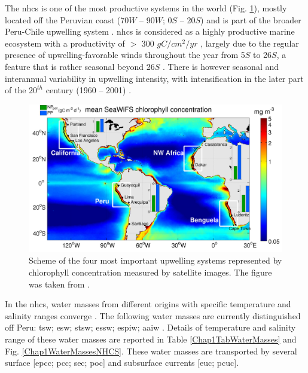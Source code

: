 The \acrshort{nhcs} is one of the most productive systems in the world (Fig. \ref{Chap1UpwellingSystems}), mostly located off the Peruvian coast (70\textdegree $W$ – 90\textdegree $W$; 0\textdegree $S$ – 20\textdegree $S$) and is part of the broader Peru-Chile upwelling system \citep{GradChai2018,TaraArnt2001}. \acrshort{nhcs} is considered as a highly productive marine ecosystem with a productivity of $>$ 300 $gC/cm^{2}/yr$ \citep{KampCap5}, largely due to the regular presence of upwelling-favorable winds throughout the year from 5\textdegree $S$ to 26\textdegree $S$, a feature that is rather seasonal beyond 26\textdegree $S$ \citep{BelmEche2014}. There is however seasonal and interannual variability in upwelling intensity, with intensification in the later part of the $20^{th}$ century (1960 – 2001) \citep{NaraPaul2010}.\\

\begin{figure}[ht]
	\includegraphics[width=1.0\textwidth]{figures/Chap1UpwellingSystems.png}
	\centering
	\caption{Scheme of the four most important upwelling systems represented by chlorophyll concentration measured by satellite images. The figure was taken from \cite{MessChav2015}.}
	\label{Chap1UpwellingSystems}
\end{figure}

In the \acrshort{nhcs}, water masses from different origins with specific temperature and salinity ranges converge \citep{SilvRoja2009,MontCola2010,ChaiDomi2013}. The following water masses are currently distinguished off Peru: \acrfull{tsw}; \acrfull{esw}; \acrfull{stsw}; \acrfull{essw}; \acrfull{espiw}; \acrfull{aaiw} \citep{GradChai2018}. Details of temperature and salinity range of these water masses are reported in Table \ref{Chap1TabWaterMasses} and Fig. \ref{Chap1WaterMassesNHCS}. These water masses are transported by several surface [\acrfull{epcc}; \acrfull{pcc}; \acrfull{sec}; \acrfull{poc}] and subsurface currents [\acrfull{euc}; \acrfull{pcuc}].\\

